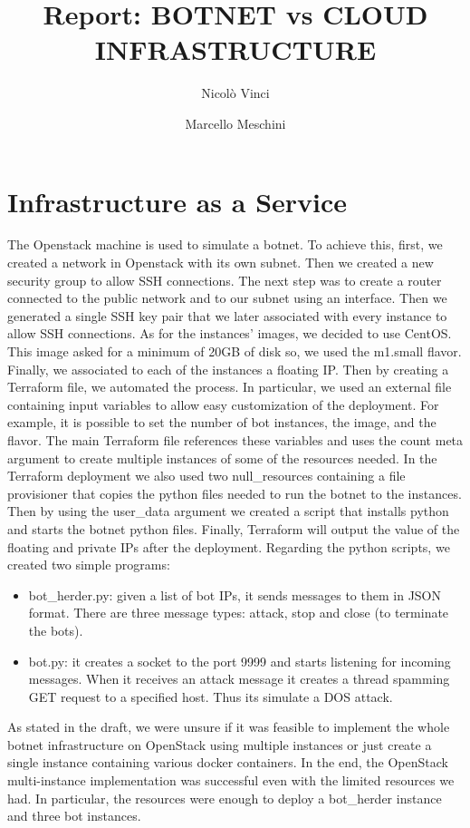 \documentclass[a4paper]{article}
\title{Report: BOTNET vs CLOUD INFRASTRUCTURE}
\author{Nicolò Vinci  \\
	\and 
	Marcello Meschini \\
	}
\date{}
\begin{document}
\maketitle

\section{Infrastructure as a Service}
\label{iaas}
The Openstack machine is used to simulate a botnet. To achieve this, first, we created a network in Openstack with its own subnet. Then we created a new security group to allow SSH connections. The next step was to create a router connected to the public network and to our subnet using an interface. Then we generated a single SSH key pair that we later associated with every instance to allow SSH connections.  As for the instances' images, we decided to use CentOS. This image asked for a minimum of 20GB of disk so, we used the m1.small flavor. Finally, we associated to each of the instances a floating IP. Then by creating a Terraform file, we automated the process. In particular, we used an external file containing input variables to allow easy customization of the deployment. For example, it is possible to set the number of bot instances, the image, and the flavor. The main Terraform file references these variables and uses the count meta argument to create multiple instances of some of the resources needed. 
In the Terraform deployment we also used two null\_resources containing a file provisioner that copies the python files needed to run the botnet to the instances. Then by using the user\_data argument we created a script that installs python and starts the botnet python files. Finally, Terraform will output the value of the floating and private IPs after the deployment.
Regarding the python scripts, we created two simple programs:
\begin{itemize}
\item bot\_herder.py: given a list of bot IPs, it sends messages to them in JSON format. There are three message types: attack, stop and close (to terminate the bots).
\item bot.py: it creates a socket to the port 9999 and starts listening for incoming messages. When it receives an attack message it creates a thread spamming GET request to a specified host. Thus its simulate a DOS attack.
\end{itemize}

As stated in the draft, we were unsure if it was feasible to implement the whole botnet infrastructure on OpenStack using multiple instances or just create a single instance containing various docker containers. In the end, the OpenStack multi-instance implementation was successful even with the limited resources we had. In particular, the resources were enough to deploy a bot\_herder instance and three bot instances.
\end{document}
